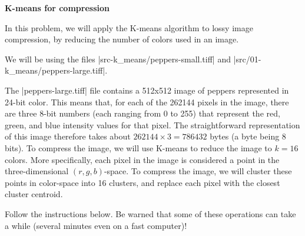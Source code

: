 \item {\bf K-means for compression}

In this problem, we will apply the K-means algorithm to lossy image
compression, by reducing the number of colors used in an image.

We will be using the files |src-k_means/peppers-small.tiff| and |src/01-k_means/peppers-large.tiff|.
	

The |peppers-large.tiff| file contains
a 512x512 image of peppers represented in 24-bit color. This means
that, for each of the 262144 pixels in the image, there are three
8-bit numbers (each ranging from 0 to 255) that represent the red,
green, and blue intensity values for that pixel. The straightforward
representation of this image therefore takes about $262144 \times 3 =
786432$ bytes (a byte being 8 bits). To compress the image, we will
use K-means to reduce the image to $k = 16$ colors. More specifically,
each pixel in the image is considered a point in the three-dimensional
$(r, g, b)$-space. To compress the image, we will cluster these points
in color-space into 16 clusters, and replace each pixel with the
closest cluster centroid.

Follow the instructions below. Be warned that some of these operations
can take a while (several minutes even on a fast computer)!


\begin{enumerate}

  

  

\end{enumerate}

